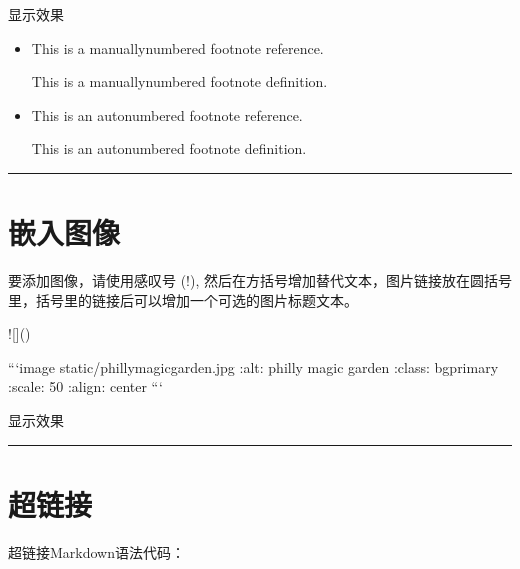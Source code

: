 \documentclass[letterpaper,10pt,english]{sphinxmanual}
\begin{document}
\sphinxAtStartPar
显示效果
\begin{itemize}
\item {} 
\sphinxAtStartPar
This is a manually\sphinxhyphen{}numbered footnote reference.%
\begin{footnote}[3]\sphinxAtStartFootnote
This is a manually\sphinxhyphen{}numbered footnote definition.
%
\end{footnote}

\item {} 
\sphinxAtStartPar
This is an auto\sphinxhyphen{}numbered footnote reference.%
\begin{footnote}[1]\sphinxAtStartFootnote
This is an auto\sphinxhyphen{}numbered footnote definition.
%
\end{footnote}

\end{itemize}


\bigskip\hrule\bigskip



\section{嵌入图像}
\label{\detokenize{other/myst_markdown:id18}}
\sphinxAtStartPar
要添加图像，请使用感叹号 (!), 然后在方括号增加替代文本，图片链接放在圆括号里，括号里的链接后可以增加一个可选的图片标题文本。

\begin{sphinxVerbatim}[commandchars=\\\{\}]
![]()

    ```\PYGZob{}image\PYGZcb{} \PYGZus{}static/philly\PYGZhy{}magic\PYGZhy{}garden.jpg
    :alt: philly magic garden
    :class: bg\PYGZhy{}primary
    :scale: 50 \PYGZpc{}
    :align: center
    ```
\end{sphinxVerbatim}

\sphinxAtStartPar
显示效果

\sphinxAtStartPar
{}



\bigskip\hrule\bigskip



\section{超链接}
\label{\detokenize{other/myst_markdown:id19}}
\sphinxAtStartPar
超链接Markdown语法代码：
\end{document}
